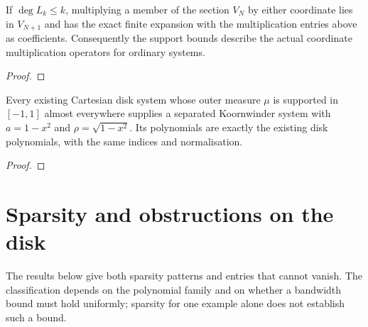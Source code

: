 \begin{theorem}
\label{thm:koornwinder-operators}
\leanok
If $\deg L_k\le k$, multiplying a member of the section $V_N$ by either
coordinate lies in $V_{N+1}$ and has the exact finite expansion with the
multiplication entries above as coefficients. Consequently the support bounds
describe the actual coordinate multiplication operators for ordinary systems.
\end{theorem}
\begin{proof}
\leanok
\end{proof}

\begin{theorem}
\label{thm:disk-koornwinder-bridge}
\leanok
Every existing Cartesian disk system whose outer measure $\mu$ is supported
in $[-1,1]$ almost everywhere supplies a separated Koornwinder system with
$a=1-x^2$ and $\rho=\sqrt{1-x^2}$. Its polynomials are exactly
the existing disk polynomials, with the same indices and normalisation.
\end{theorem}
\begin{proof}
\leanok
\end{proof}

\chapter{Sparsity and obstructions on the disk}\label{chap:disk-sparsity}
The results below give both sparsity patterns and entries that cannot vanish.
The classification depends on the polynomial family and on whether a bandwidth
bound must hold uniformly; sparsity for one example alone does not establish
such a bound.

